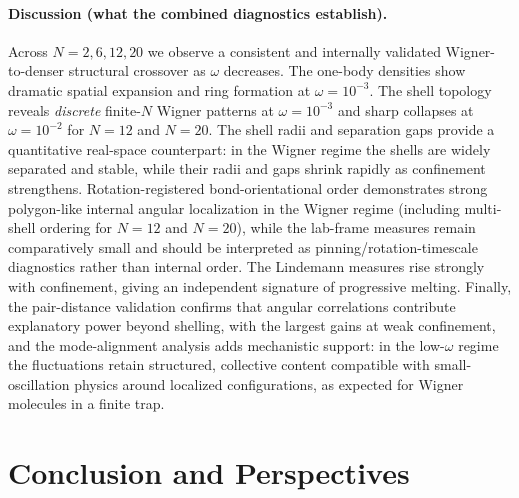 \documentclass[superscriptaddress,unsortedaddress,amsmath,amssymb,aps]{revtex4-2}
\begin{document}

\paragraph{Discussion (what the combined diagnostics establish).}
Across $N=2,6,12,20$ we observe a consistent and internally validated Wigner-to-denser structural crossover as $\omega$
decreases. The one-body densities show dramatic spatial expansion and ring formation at $\omega=10^{-3}$.
The shell topology reveals \emph{discrete} finite-$N$ Wigner patterns at $\omega=10^{-3}$ and sharp collapses at
$\omega=10^{-2}$ for $N=12$ and $N=20$. The shell radii and separation gaps provide a quantitative real-space
counterpart: in the Wigner regime the shells are widely separated and stable, while their radii and gaps shrink
rapidly as confinement strengthens. Rotation-registered bond-orientational order demonstrates strong polygon-like
internal angular localization in the Wigner regime (including multi-shell ordering for $N=12$ and $N=20$), while the
lab-frame measures remain comparatively small and should be interpreted as pinning/rotation-timescale diagnostics
rather than internal order. The Lindemann measures rise strongly with confinement, giving an independent signature of
progressive melting. Finally, the pair-distance validation confirms that angular correlations contribute explanatory
power beyond shelling, with the largest gains at weak confinement, and the mode-alignment analysis adds mechanistic
support: in the low-$\omega$ regime the fluctuations retain structured, collective content compatible with
small-oscillation physics around localized configurations, as expected for Wigner molecules in a finite trap.
\section{Conclusion and Perspectives}



\end{document}
